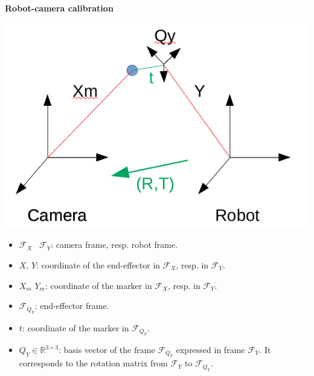 \documentclass{beamer}
\begin{document}
\begin{frame}
\textbf{Robot-camera calibration}
\begin{center}
\includegraphics[scale=0.5]{Pictures/RobotCameraCalibrationFrame.png}
\end{center}
\end{frame}

\begin{frame}
\begin{itemize}
\item $\mathcal{F}_X$ ~$\mathcal{F}_Y$: camera frame, resp. robot frame. 
\item $X$, $Y$: coordinate of the end-effector in $\mathcal{F}_X$, resp. in $\mathcal{F}_Y$.
\item $X_m$ $Y_m$: coordinate of the marker in $\mathcal{F}_X$, resp. in $\mathcal{F}_Y$.
\item $\mathcal{F}_{Q_Y}$: end-effector frame.
\item $t$: coordinate of the marker in $\mathcal{F}_{Q_Y}$.
\item $Q_Y \in \mathbb{R}^{3 \times 3}$: basis vector of the frame $\mathcal{F}_{Q_Y}$ expressed in frame $\mathcal{F}_Y$. It corresponds to the rotation matrix from $\mathcal{F}_{Y}$  to $\mathcal{F}_{Q_Y}$. 
\end{itemize}
\end{frame}
\end{document}

